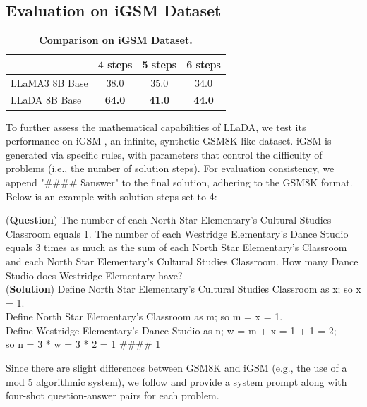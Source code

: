 \documentclass{article}
\begin{document}
\subsection{Evaluation on iGSM Dataset}
\label{app:igsm}


\begin{table}[t!]
    \centering 
    \caption{\textbf{Comparison on iGSM Dataset.}} 
    \vspace{0.2cm}
    \begin{tabular}{lccc}
        \toprule
     & 4 steps & 5 steps & 6 steps \\ 
     \midrule
     LLaMA3 8B Base & 38.0 & 35.0 & 34.0 \\
     LLaDA 8B Base  & \textbf{64.0} & \textbf{41.0} & \textbf{44.0} \\
\bottomrule
    \end{tabular}
    \label{tbl:math}
    \vspace{-.2cm}
\end{table}

To further assess the mathematical capabilities of LLaDA, we test its performance on iGSM \cite{YXLA2024-gsm1}, 
an infinite, synthetic GSM8K-like dataset. 
iGSM is generated via specific rules, 
with parameters that control the difficulty of problems (i.e., the number of solution steps).
For evaluation consistency,
we append "\#\#\#\# \$answer" to the final solution, adhering to the GSM8K format. 
Below is an example with solution steps set to 4:


\begin{framed}
(\textbf{Question}) The number of each North Star Elementary's Cultural Studies Classroom equals 1. 
The number of each Westridge Elementary's Dance Studio equals 3 times as much as the sum of each North Star Elementary's Classroom and each North Star Elementary's Cultural Studies Classroom. 
How many Dance Studio does Westridge Elementary have? 
\\
(\textbf{Solution}) Define North Star Elementary's Cultural Studies Classroom as x; so x = 1. \\
Define North Star Elementary's Classroom as m; so m = x = 1. \\
Define Westridge Elementary's Dance Studio as n; w = m + x = 1 + 1 = 2; \\
so n = 3 * w = 3 * 2 = 1  \#\#\#\# 1
\end{framed}


Since there are slight differences between GSM8K and iGSM (e.g., the use of a mod 5 algorithmic system), we follow \cite{YXLA2024-gsm1} and provide a system prompt along with four-shot question-answer pairs for each problem.
\end{document}
